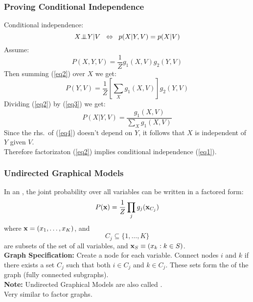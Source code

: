 \begin{frame}
\frametitle{Proving Conditional Independence}

Conditional independence:
\begin{equation}
X{\bot\negthickspace\negthickspace\bot} Y|V \;\; \Leftrightarrow \;\; p(X|Y,V)=p(X|V)
\label{eq1}
\end{equation}
Assume:
\begin{equation}
P(X,Y,V) = \frac{1}{Z} g_1(X,V) g_2(Y,V) 
\label{eq2}
\end{equation}
Then summing (\ref{eq2}) over $X$ we get:
\begin{equation}
P(Y,V) = \frac{1}{Z} [ \sum_X g_1(X,V)] g_2(Y,V) 
\label{eq3}
\end{equation}
Dividing (\ref{eq2}) by (\ref{eq3}) we get:
\begin{equation}
P(X|Y,V) = \frac{g_1(X,V)}{\sum_X g_1(X,V)}
\label{eq4}
\end{equation}
Since the rhs.\ of (\ref{eq4}) doesn't depend on $Y$, it follows
that $X$ is independent of $Y$ given $V$. \\
Therefore factorizaton (\ref{eq2}) implies conditional independence (\ref{eq1}).


\end{frame}
\begin{frame}
\frametitle{Undirected Graphical Models}

In an , the joint probability over all
variables can be written in a factored form:  
\[
P({\bf x}) = \frac{1}{Z} \prod_j g_j({\bf x}_{C_j})
\]
where ${\bf x}=(x_1, \ldots, x_K)$, and  
\[
C_j \subseteq \{ 1, \ldots, K\}
\] 
are subsets of the set of all variables, and ${\bf x}_S \equiv (x_k :
k \in S)$. \\


{\bf Graph Specification:} Create a node for each variable. Connect nodes $i$
and $k$   if there exists a set $C_j$ such that  both $i \in C_j$ and
$k \in C_j$.  These sets form the  of the graph (fully
connected subgraphs).\\

{\bf Note:} Undirected Graphical Models are also called . \\

Very similar to factor graphs.


\end{frame}

